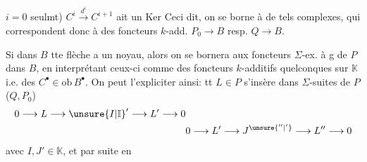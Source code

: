 $i=0$ seulmt) $C^i\xrightarrow{d^i}C^{i+1}$ ait un Ker  Ceci dit, on se borne à de tels complexes, qui correspondent donc à des foncteurs  $k$-add.  $P_0\longrightarrow B$ resp. $Q\longrightarrow B$. 

Si  dans $B$ tte flèche a un noyau, alors on se bornera aux foncteurs $\Sigma$-ex. à g de $P$ dans $B$, en  interprétant ceux-ci comme des foncteurs $k$-additifs quelconques sur $\mathbb{K}$ i.e. des $C^{\bullet}\in\mathrm{ob}\,B^{\bullet}$. On peut l'expliciter ainsi: tt $L\in P$   s'insère dans  $\Sigma$-suites de $P$ ($Q,P_0$)
\[
\begin{aligned}
0\longrightarrow L\longrightarrow \unsure{I|\mathbb I}'\longrightarrow L'\longrightarrow0&\\
&0\longrightarrow L'\longrightarrow J^{\unsure{''|'}}\longrightarrow L''\longrightarrow0
\end{aligned}
\]
avec $I,J'\in\mathbb{K}$, et par suite en
